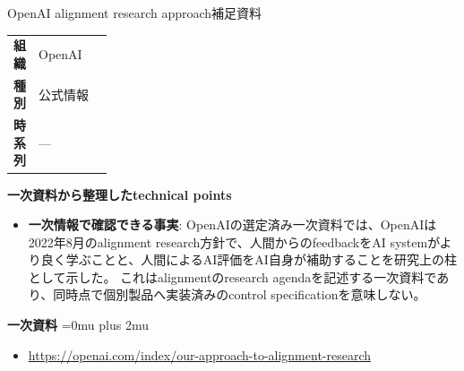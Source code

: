 \begin{technicalnote}{OpenAI alignment research approach}{補足資料}
\begingroup
\begin{tabularx}{\linewidth}{@{}>{\bfseries}p{0.22\linewidth}X@{}}
組織 & OpenAI \\
種別 & 公式情報 \\
時系列 & — \\
\end{tabularx}
\smallskip
{\bfseries 一次資料から整理したtechnical points}
\begin{itemize}[leftmargin=1.5em,itemsep=0.35em]
\item \textbf{一次情報で確認できる事実}: OpenAIの選定済み一次資料では、OpenAIは2022年8月のalignment research方針で、人間からのfeedbackをAI systemがより良く学ぶことと、人間によるAI評価をAI自身が補助することを研究上の柱として示した。 これはalignmentのresearch agendaを記述する一次資料であり、同時点で個別製品へ実装済みのcontrol specificationを意味しない。
\end{itemize}
\begin{minipage}{\linewidth}
\begin{samepage}
{\bfseries 一次資料}
\begingroup\sloppy
\Urlmuskip=0mu plus 2mu\relax
\begin{itemize}[leftmargin=1.5em,itemsep=0.25em]
\item {\scriptsize\url{https://openai.com/index/our-approach-to-alignment-research}}
\end{itemize}
\endgroup
\end{samepage}
\end{minipage}
\endgroup
\end{technicalnote}
\medskip


